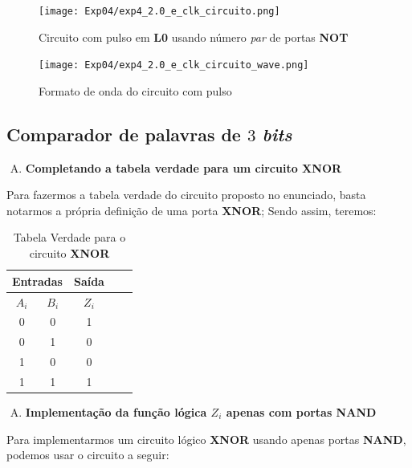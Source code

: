 \documentclass[12pt]{article}
\begin{document}
\begin{figure}[H]
    \centering
    \texttt{[image: Exp04/exp4\_2.0\_e\_clk\_circuito.png]}
    \caption{Circuito com pulso em \textbf{L0} usando número \emph{par} de portas \textbf{NOT}}\label{fig:exp4_2.0_e_clk_circuito.png}
\end{figure}

\begin{figure}[H]
    \centering
    \texttt{[image: Exp04/exp4\_2.0\_e\_clk\_circuito\_wave.png]}
    \caption{Formato de onda do circuito com pulso}\label{fig:exp4_2.0_e_clk_circuito_wave.png}
\end{figure}


\subsection{Comparador de palavras de \(3\) \emph{bits}}\label{sec:comparador_de_palavras_3_bits}

\begin{enumerate}[A)]
\item \textbf{Completando a tabela verdade para um circuito \textbf{XNOR}}
\end{enumerate}

Para fazermos a tabela verdade do circuito proposto no enunciado, basta notarmos
a própria definição de uma porta \textbf{XNOR}; Sendo assim, teremos:

\begin{table}[H]
    \centering
    \caption{Tabela Verdade para o circuito \textbf{XNOR}}
    \begin{tabular}{|c|c|c|c|c|}\hline
    \multicolumn{2}{|c|}{Entradas} & \multicolumn{1}{|c|}{Saída} \\\hline
    $A_{i}$ & $B_{i}$ & $Z_{i}$ \\\hline
    0 & 0 & 1 \\\hline
    0 & 1 & 0 \\\hline
    1 & 0 & 0 \\\hline
    1 & 1 & 1 \\\hline
    \end{tabular}\label{tab:comparador_de_palavras_3_bits}
\end{table}

\begin{enumerate}[B)]
\item \textbf{Implementação da função lógica $Z_{i}$ apenas com portas NAND}
\end{enumerate}

Para implementarmos um circuito lógico \textbf{XNOR} usando apenas portas
\textbf{NAND}, podemos usar o circuito a seguir:
\end{document}

